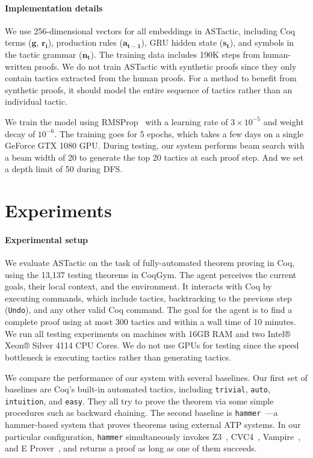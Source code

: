 \documentclass{article}
\newcommand{\smallsec}[1]{\vspace{-3mm} \paragraph{#1}}
\newcommand{\datasetname}{CoqGym}
\newcommand{\numberoftestproofs}{13,137 }
\newcommand{\numberofhumantrainvalidsteps}{190K }
\begin{document}
\smallsec{Implementation details}
We use 256-dimensional vectors for all embeddings in ASTactic, including Coq terms ($\mathbf{g}$, $\mathbf{r_i}$),  production rules ($\mathbf{a_{t-1}}$), GRU hidden state ($\mathbf{s_t}$), and symbols in the tactic grammar ($\mathbf{n_t}$).
The training data includes \numberofhumantrainvalidsteps steps from human-written proofs. 
We do not train ASTactic with synthetic proofs since they only contain tactics extracted from the human proofs. For a method to benefit from synthetic proofs, it should model the entire sequence of tactics rather than an individual tactic.

We train the model using RMSProp~\citep{Tieleman2012} with a learning rate of $3 \times 10^{-5}$ and weight decay of $10^{-6}$.
The training goes for 5 epochs, which takes a few days on a single GeForce GTX 1080 GPU. During testing, our system performs beam search with a beam width of 20 to generate the top 20 tactics at each proof step. And we set a depth limit of 50 during DFS.


\section{Experiments}

\vspace{2mm}

\smallsec{Experimental setup} We evaluate ASTactic on the task of fully-automated theorem proving in Coq, using the \numberoftestproofs testing theorems in \datasetname.
The agent perceives the current goals, their local context, and the environment.
It interacts with Coq by executing commands, which include tactics, backtracking to the previous step (\texttt{Undo}), and any other valid Coq command.
The goal for the agent is to find a complete proof using at most 300 tactics and within a wall time of 10 minutes.
We run all testing experiments on machines with 16GB RAM and two Intel® Xeon® Silver 4114 CPU Cores. 
We do not use GPUs for testing since the speed bottleneck is executing tactics rather than generating tactics.



We compare the performance of our system with several baselines. Our first set of baselines are Coq's built-in automated tactics, including \texttt{trivial}, \texttt{auto}, \texttt{intuition}, and \texttt{easy}. 
They all try to prove the theorem via some simple procedures such as backward chaining.
The second baseline is \texttt{hammer}~\citep{czajka2018hammer}---a hammer-based system that proves theorems using external ATP systems.
In our particular configuration, \texttt{hammer} simultaneously invokes Z3~\cite{de2008z3}, CVC4~\citep{BCD+11}, Vampire~\citep{kovacs2013first}, and E Prover~\citep{schulz2013system}, and returns a proof as long as one of them succeeds.
\end{document}
